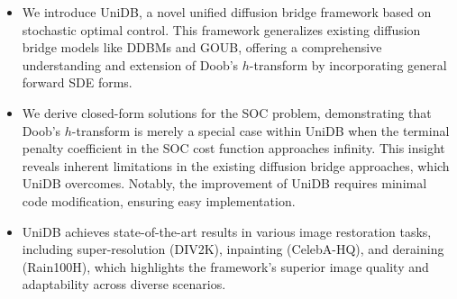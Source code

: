 \begin{itemize}

\vspace{-3mm}

\item We introduce UniDB, a novel unified diffusion bridge framework based on stochastic optimal control. This framework generalizes existing diffusion bridge models like DDBMs and GOUB, offering a comprehensive understanding and extension of Doob’s $h$-transform by incorporating general forward SDE forms.



\item We derive closed-form solutions for the SOC problem, demonstrating that Doob’s $h$-transform is merely a special case within UniDB when the terminal penalty coefficient in the SOC cost function approaches infinity. This insight reveals inherent limitations in the existing diffusion bridge approaches, which UniDB overcomes. Notably, the improvement of UniDB requires minimal code modification, ensuring easy implementation. 


\item UniDB achieves state-of-the-art results in various image restoration tasks, including super-resolution (DIV2K), inpainting (CelebA-HQ), and deraining (Rain100H), which highlights the framework’s superior image quality and adaptability across diverse scenarios. 

\end{itemize}